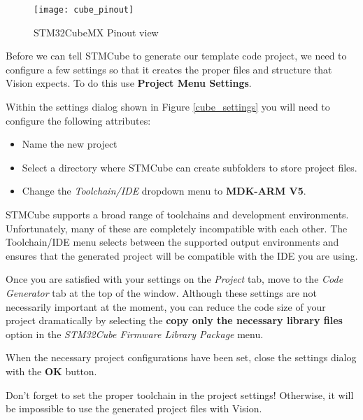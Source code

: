 \documentclass[11pt,fleqn]{book} %
\begin{document}
\begin{figure}[h!]
	\centering\texttt{[image: cube\_pinout]}
	\caption{STM32CubeMX Pinout view}
	\label{cube_pinout}
\end{figure}

Before we can tell STMCube to generate our template code project, we need to configure a few settings so that it creates the proper files and structure that {\textmu}Vision expects. To do this use \textbf{Project Menu \textrightarrow Settings}. 

Within the settings dialog shown in Figure \ref{cube_settings} you will need to configure the following attributes:
\begin{itemize}
	\item Name the new project
	\item Select a directory where STMCube can create subfolders to store project files.
	\item Change the \textit{Toolchain/IDE} dropdown menu to \textbf{MDK-ARM V5}.
\end{itemize}

STMCube supports a broad range of toolchains and development environments. Unfortunately, many of these are completely incompatible with each other. The Toolchain/IDE menu selects between the supported output environments and ensures that the generated project will be compatible with the IDE you are using. 

Once you are satisfied with your settings on the \textit{Project} tab, move to the \textit{Code Generator} tab at the top of the window. Although these settings are not necessarily important at the moment, you can reduce the code size of your project dramatically by selecting the \textbf{copy only the necessary library files} option in the \textit{STM32Cube Firmware Library Package} menu.
 
When the necessary project configurations have been set, close the settings dialog with the \textbf{OK} button. 

\begin{warning}
	Don't forget to set the proper toolchain in the project settings! Otherwise, it will be impossible to use the generated project files with {\textmu}Vision.
\end{warning}
\end{document}
